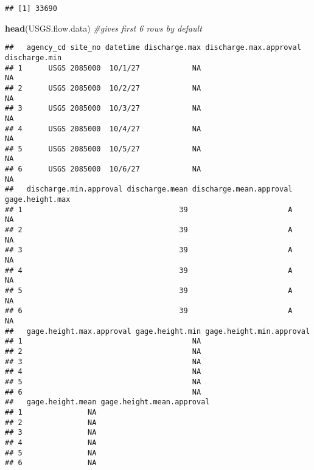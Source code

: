\documentclass[]{article}
\newenvironment{Shaded}{\begin{snugshade}}{\end{snugshade}}
\newcommand{\CommentTok}[1]{\textcolor[rgb]{0.56,0.35,0.01}{\textit{#1}}}
\newcommand{\KeywordTok}[1]{\textcolor[rgb]{0.13,0.29,0.53}{\textbf{#1}}}
\newcommand{\NormalTok}[1]{#1}
\begin{document}
\begin{verbatim}
## [1] 33690
\end{verbatim}

\begin{Shaded}
\begin{Highlighting}[]
\KeywordTok{head}\NormalTok{(USGS.flow.data) }\CommentTok{#gives first 6 rows by default}
\end{Highlighting}
\end{Shaded}

\begin{verbatim}
##   agency_cd site_no datetime discharge.max discharge.max.approval discharge.min
## 1      USGS 2085000  10/1/27            NA                                   NA
## 2      USGS 2085000  10/2/27            NA                                   NA
## 3      USGS 2085000  10/3/27            NA                                   NA
## 4      USGS 2085000  10/4/27            NA                                   NA
## 5      USGS 2085000  10/5/27            NA                                   NA
## 6      USGS 2085000  10/6/27            NA                                   NA
##   discharge.min.approval discharge.mean discharge.mean.approval gage.height.max
## 1                                    39                       A              NA
## 2                                    39                       A              NA
## 3                                    39                       A              NA
## 4                                    39                       A              NA
## 5                                    39                       A              NA
## 6                                    39                       A              NA
##   gage.height.max.approval gage.height.min gage.height.min.approval
## 1                                       NA                         
## 2                                       NA                         
## 3                                       NA                         
## 4                                       NA                         
## 5                                       NA                         
## 6                                       NA                         
##   gage.height.mean gage.height.mean.approval
## 1               NA                          
## 2               NA                          
## 3               NA                          
## 4               NA                          
## 5               NA                          
## 6               NA
\end{verbatim}
\end{document}
